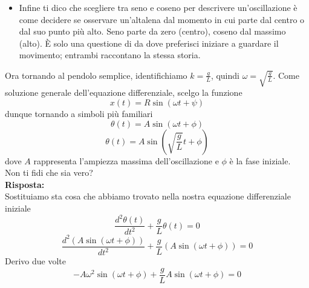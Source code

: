\documentclass[twoside]{article}
\begin{document}
{{\begin{itemize}
\begin{itemize}
\begin{itemize}
                  \end{itemize}
                  \begin{equation*}
                    x(t) = A\cos(\omega t) + B\sin(\omega t) = R\cos(\omega t + \phi)
                  \end{equation*}
                  \begin{equation*}
                    x(t) = A\cos(\omega t) + B\sin(\omega t) = R\sin(\omega t + \psi)
                  \end{equation*}
          \end{itemize}
    \item Infine ti dico che scegliere tra seno e coseno per descrivere un'oscillazione è come decidere se osservare un'altalena dal momento in cui parte dal centro o dal suo punto più alto. Seno parte da zero (centro), coseno dal massimo (alto). È solo una questione di da dove preferisci iniziare a guardare il movimento; entrambi raccontano la stessa storia.
  \end{itemize}
}}
Ora tornando al pendolo semplice, identifichiamo \(k = \frac{g}{L}\), quindi \(\omega = \sqrt{\frac{g}{L}}\). Come soluzione generale dell'equazione differenziale, scelgo la funzione
\begin{equation*}
  x(t)= R\sin(\omega t + \psi)
\end{equation*}
dunque tornando a simboli più familiari
\begin{equation*}
  \theta(t) = A\sin(\omega t + \phi)
\end{equation*}
\begin{equation*}
  \theta(t) = A \sin\left(\sqrt{\frac{g}{L}} t + \phi\right)
\end{equation*}
dove \(A\) rappresenta l'ampiezza massima dell'oscillazione e \(\phi\) è la fase iniziale.\\
Non ti fidi che sia vero?\\
\textbf{Risposta:} \\
Sostituiamo sta cosa che abbiamo trovato nella nostra equazione differenziale iniziale
\begin{equation*}
  \frac{d^2\theta(t)}{dt^2} + \frac{g}{L} \theta(t) = 0
\end{equation*}
\begin{equation*}
  \frac{d^2 \left(A \sin\left(\omega t + \phi\right)\right)}{dt^2} + \frac{g}{L} \left(A \sin\left(\omega t + \phi\right)\right) = 0
\end{equation*}
Derivo due volte
\begin{equation*}
  -A \omega^2 \sin\left(\omega t + \phi\right) + \frac{g}{L} A \sin\left(\omega t + \phi\right) = 0
\end{equation*}
\end{document}
